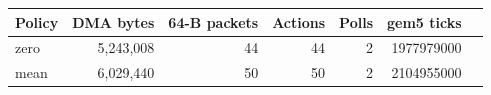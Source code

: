 \begin{tabular}{lrrrrrr}
\toprule
Policy & DMA bytes & 64-B packets & Actions & Polls & gem5 ticks \\
\midrule
zero & 5,243,008 & 44 & 44 & 2 & 1977979000 \\
mean & 6,029,440 & 50 & 50 & 2 & 2104955000 \\
\bottomrule
\end{tabular}
